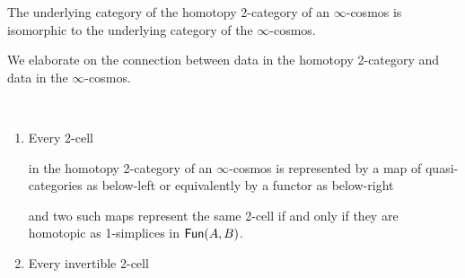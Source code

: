 \begin{lemma}\label{lem:underlying-cat-iso}
  The underlying category of the homotopy 2-category of an $\infty$-cosmos is isomorphic to the underlying category of the $\infty$-cosmos.
\end{lemma}

We elaborate on the connection between data in the homotopy 2-category and data in the $\infty$-cosmos.

\begin{lemma}\label{lem:invertible-2-cell}$\quad$
  \begin{enumerate}
  \item\label{itm:2-cell-as-functor} Every 2-cell
  \begin{center}
  \end{center}  in the homotopy 2-category of an $\infty$-cosmos is represented by a map of quasi-categories as below-left or equivalently by a functor as below-right
  \begin{center}
  \end{center}
  and two such maps represent the same 2-cell if and only if they are homotopic as 1-simplices in ${\mathord{\mathsf{Fun}}}(A,B)$.
  \item\label{itm:2-iso-as-functor} Every invertible 2-cell
  \begin{center}
  \end{center}

\end{enumerate}
\end{lemma}
